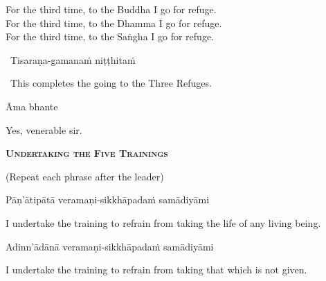 \begin{english-verses}
  For the third time, to the Buddha I go for refuge.\\
  For the third time, to the Dhamma I go for refuge.\\
  For the third time, to the Saṅgha I go for refuge.
\end{english-verses}

\begin{leader-only}
  \anglebracketleft\ \hspace{-0.5mm}Tisaraṇa-gamanaṁ niṭṭhitaṁ \hspace{-0.5mm}\anglebracketright\
\end{leader-only}

\begin{leader-english}
  \anglebracketleft\ \hspace{-0.5mm}This completes the going to the Three Refuges. \hspace{-0.5mm}\anglebracketright\
\end{leader-english}

Āma bhante

\begin{english}
  Yes, venerable sir.
\end{english}

\clearpage



\begin{center}
  \textbf{\textsc{Undertaking the Five Trainings}}
\end{center}

\begin{center}
  (Repeat each phrase after the leader)
\end{center}

Pāṇ'ātipātā veramaṇi-sikkhāpadaṁ samādiyāmi

\begin{english-hang}
  I undertake the training\ifdigitalversion\makeatletter\hyperlink{endnote139-appendix}\makeatother \thinspace\fi
  to refrain from taking the life of any living being.
\end{english-hang}

Adinn'ādānā veramaṇi-sikkhāpadaṁ samādiyāmi

\begin{english}
  I undertake the training to refrain from taking that which is not given.
\end{english}

